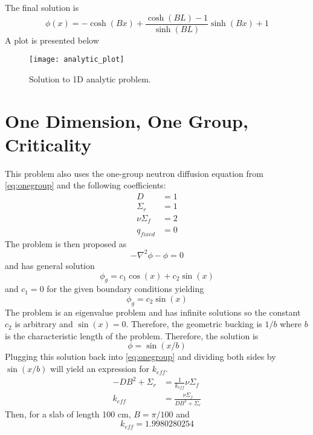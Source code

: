 \documentclass{article}
\begin{document}
  The final solution is 
  \begin{equation} \label{eq:one_dimension}
    \phi(x) = -\cosh(Bx) + \frac{\cosh(BL)-1}{\sinh(BL)} \sinh(Bx) +1
  \end{equation}
  A plot is presented below
  \begin{figure}[H] 
    \centering
    \texttt{[image: analytic\_plot]}
    \caption{Solution to 1D analytic problem.}
    \label{fg:analytic_plot}
  \end{figure}
  
\section{One Dimension, One Group, Criticality} \label{sc:onegroup1d}
  This problem also uses the one-group neutron diffusion equation from 
  \eqref{eq:onegroup} and the following coefficients:
  \begin{align*}
    D &= 1\\
    \Sigma_r &= 1\\
    \nu \Sigma_f &= 2\\
    q_{fixed} &= 0
  \end{align*}
  The problem is then proposed as 
  \begin{equation}
    -\nabla^2 \phi - \phi = 0 
  \end{equation}
  and has general solution
  \begin{equation}
    \phi_g = c_1 \cos(x) + c_2 \sin(x)
  \end{equation}
  and $c_1 = 0 $ for the given boundary conditions yielding
  \begin{equation} \label{eq:sinshape}
    \phi_g = c_2 \sin(x)
  \end{equation}
  The problem is an eigenvalue problem and has infinite solutions so the 
  constant $c_2$ is arbitrary and $\sin(x)=0$. Therefore, the geometric 
  bucking is $1/b$ where $b$ is the characteristic length of the problem. 
  Therefore, the solution is 
  \begin{equation} \label{eq:onedimensionsol}
    \phi = \sin(x/b)
  \end{equation}
  Plugging this solution back into \eqref{eq:onegroup} and dividing both sides
  by $\sin(x/b)$ will yield an expression for $k_{eff}$.
  \begin{align}
    -D B^2 + \Sigma_r &= \frac{1}{k_{eff}} \nu \Sigma_f \\
    k_{eff} &= \frac{\nu \Sigma_f}{DB^2 + \Sigma_r} \label{eq:keff1d}
  \end{align}
  Then, for a slab of length 100 cm, $B = \pi / 100$ and
  \[ k_{eff} = 1.9980280254 \]
\end{document}
